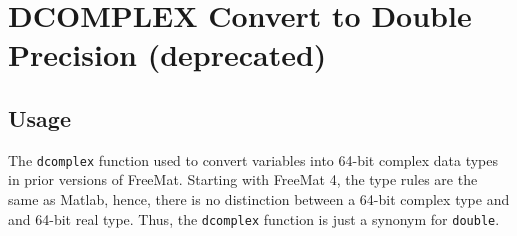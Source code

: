 \section{DCOMPLEX Convert to Double Precision (deprecated)}

\subsection{Usage}

The \verb|dcomplex| function used to convert variables into 64-bit
complex data types in prior versions of FreeMat.  Starting with FreeMat 4,
the type rules are the same as Matlab, hence, there is no distinction
between a 64-bit complex type and and 64-bit real type.  Thus, the \verb|dcomplex|
function is just a synonym for \verb|double|.
